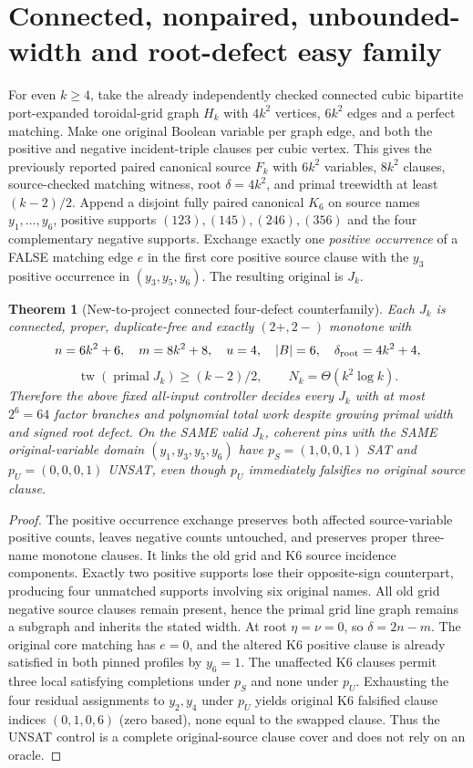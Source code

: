 \documentclass[11pt]{article}
\newtheorem{theorem}{Theorem}
\begin{document}
\section{Connected, nonpaired, unbounded-width and root-defect easy family}
For even $k\ge4$, take the already independently checked connected cubic bipartite port-expanded toroidal-grid graph $H_k$ with $4k^2$ vertices, $6k^2$ edges and a perfect matching. Make one original Boolean variable per graph edge, and both the positive and negative incident-triple clauses per cubic vertex. This gives the previously reported paired canonical source $F_k$ with $6k^2$ variables, $8k^2$ clauses, source-checked matching witness, root $\delta=4k^2$, and primal treewidth at least $(k-2)/2$. Append a disjoint fully paired canonical $K_6$ on source names $y_1,\ldots,y_6$, positive supports $(123),(145),(246),(356)$ and the four complementary negative supports. Exchange exactly one \emph{positive occurrence} of a FALSE matching edge $e$ in the first core positive source clause with the $y_3$ positive occurrence in $(y_3,y_5,y_6)$. The resulting original is $J_k$.
\begin{theorem}[New-to-project connected four-defect counterfamily]
Each $J_k$ is connected, proper, duplicate-free and exactly $(2+,2-)$ monotone with
\[
n=6k^2+6,\quad m=8k^2+8,\quad u=4,\quad |B|=6,\quad \delta_{\rm root}=4k^2+4,
\]
\[
\operatorname{tw}(\operatorname{primal}J_k)\ge(k-2)/2,\qquad N_k=\Theta(k^2\log k).
\]
Therefore the above fixed all-input controller decides every $J_k$ with at most $2^6=64$ factor branches and polynomial total work despite growing primal width and signed root defect. On the SAME valid $J_k$, coherent pins with the SAME original-variable domain $(y_1,y_3,y_5,y_6)$ have $p_S=(1,0,0,1)$ SAT and $p_U=(0,0,0,1)$ UNSAT, even though $p_U$ immediately falsifies no original source clause.
\end{theorem}
\begin{proof}
The positive occurrence exchange preserves both affected source-variable positive counts, leaves negative counts untouched, and preserves proper three-name monotone clauses. It links the old grid and K6 source incidence components. Exactly two positive supports lose their opposite-sign counterpart, producing four unmatched supports involving six original names. All old grid negative source clauses remain present, hence the primal grid line graph remains a subgraph and inherits the stated width. At root $\eta=\nu=0$, so $\delta=2n-m$. The original core matching has $e=0$, and the altered K6 positive clause is already satisfied in both pinned profiles by $y_6=1$. The unaffected K6 clauses permit three local satisfying completions under $p_S$ and none under $p_U$. Exhausting the four residual assignments to $y_2,y_4$ under $p_U$ yields original K6 falsified clause indices $(0,1,0,6)$ (zero based), none equal to the swapped clause. Thus the UNSAT control is a complete original-source clause cover and does not rely on an oracle.
\end{proof}
\end{document}
